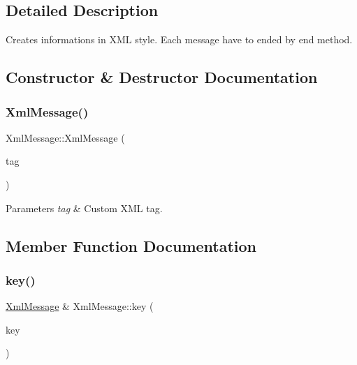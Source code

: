 \subsection{Detailed Description}
Creates informations in X\+ML style. Each message have to ended by end method. 

\subsection{Constructor \& Destructor Documentation}
\mbox{\label{classXmlMessage_a81b72c91fddb884f5aaf88ca26390a75}} 
\subsubsection{\texorpdfstring{Xml\+Message()}{XmlMessage()}}
{\footnotesize\ttfamily Xml\+Message\+::\+Xml\+Message (\begin{DoxyParamCaption}\item[{const Q\+String \&}]{tag }\end{DoxyParamCaption})\hspace{0.3cm}{\ttfamily [explicit]}}


\begin{DoxyParams}{Parameters}
{\em tag} & Custom X\+ML tag. \\
\hline
\end{DoxyParams}


\subsection{Member Function Documentation}
\mbox{\label{classXmlMessage_a01b2e1d62348aad36158687344d50518}} 
\subsubsection{\texorpdfstring{key()}{key()}}
{\footnotesize\ttfamily \hyperlink{classXmlMessage}{Xml\+Message} \& Xml\+Message\+::key (\begin{DoxyParamCaption}\item[{const Q\+String \&}]{key }\end{DoxyParamCaption})\hspace{0.3cm}{\ttfamily [virtual]}}


